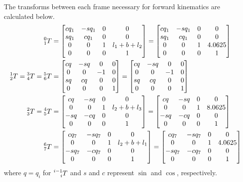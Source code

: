 \documentclass{article}
\begin{document}
The transforms between each frame necessary for forward kinematics are calculated below.
\begin{align}
  \prescript{0}{1}T &= \begin{bmatrix}
    cq_1 & -sq_1 & 0 & 0 \\
    sq_1 & cq_1 & 0 & 0 \\
    0 & 0 & 1 & l_1 + b + l_2 \\
    0 & 0 & 0 & 1
  \end{bmatrix} = \begin{bmatrix}
    cq_1 & -sq_1 & 0 & 0 \\
    sq_1 & cq_1 & 0 & 0 \\
    0 & 0 & 1 & 4.0625 \\
    0 & 0 & 0 & 1
  \end{bmatrix} \\
  \prescript{1}{2}T = \prescript{3}{4}T = \prescript{5}{6}T &= \begin{bmatrix}
    cq & -sq & 0 & 0 \\
    0 & 0 & -1 & 0 \\
    sq & cq & 0 & 0 \\
    0 & 0 & 0 & 1
  \end{bmatrix} = \begin{bmatrix}
    cq & -sq & 0 & 0 \\
    0 & 0 & -1 & 0 \\
    sq & cq & 0 & 0 \\
    0 & 0 & 0 & 1
  \end{bmatrix} \\
  \prescript{2}{3}T = \prescript{4}{5}T &= \begin{bmatrix}
    cq & -sq & 0 & 0 \\
    0 & 0 & 1 & l_2 + b + l_3 \\
    -sq & -cq & 0 & 0 \\
    0 & 0 & 0 & 1
  \end{bmatrix} = \begin{bmatrix}
    cq & -sq & 0 & 0 \\
    0 & 0 & 1 & 8.0625 \\
    -sq & -cq & 0 & 0 \\
    0 & 0 & 0 & 1
  \end{bmatrix} \\
  \prescript{6}{7}T &= \begin{bmatrix}
    cq_7 & -sq_7 & 0 & 0 \\
    0 & 0 & 1 & l_2 + b + l_1 \\
    -sq_7 & -cq_7 & 0 & 0 \\
    0 & 0 & 0 & 1
  \end{bmatrix} = \begin{bmatrix}
    cq_7 & -sq_7 & 0 & 0 \\
    0 & 0 & 1 & 4.0625 \\
    -sq_7 & -cq_7 & 0 & 0 \\
    0 & 0 & 0 & 1
  \end{bmatrix}
\end{align}
where $q = q_i$ for $\prescript{i-1}{i}T$ and $s$ and $c$ represent $\sin$ and $\cos$, respectively.
\end{document}
